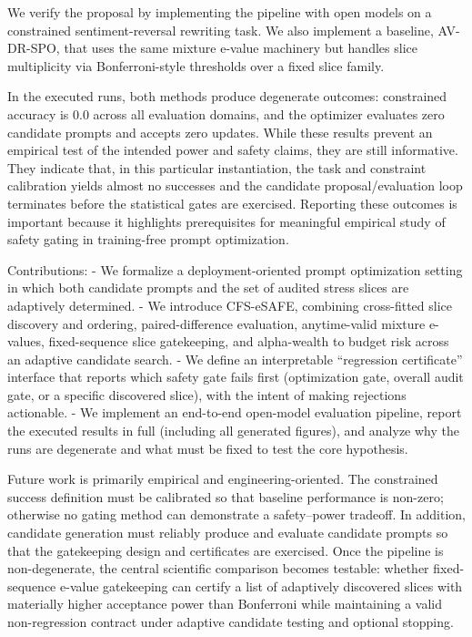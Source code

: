 \documentclass{article} %
\begin{document}
We verify the proposal by implementing the pipeline with open models on a constrained sentiment-reversal rewriting task. We also implement a baseline, AV-DR-SPO, that uses the same mixture e-value machinery but handles slice multiplicity via Bonferroni-style thresholds over a fixed slice family.

In the executed runs, both methods produce degenerate outcomes: constrained accuracy is 0.0 across all evaluation domains, and the optimizer evaluates zero candidate prompts and accepts zero updates. While these results prevent an empirical test of the intended power and safety claims, they are still informative. They indicate that, in this particular instantiation, the task and constraint calibration yields almost no successes and the candidate proposal/evaluation loop terminates before the statistical gates are exercised. Reporting these outcomes is important because it highlights prerequisites for meaningful empirical study of safety gating in training-free prompt optimization.

Contributions:
- We formalize a deployment-oriented prompt optimization setting in which both candidate prompts and the set of audited stress slices are adaptively determined.
- We introduce CFS-eSAFE, combining cross-fitted slice discovery and ordering, paired-difference evaluation, anytime-valid mixture e-values, fixed-sequence slice gatekeeping, and alpha-wealth to budget risk across an adaptive candidate search.
- We define an interpretable “regression certificate” interface that reports which safety gate fails first (optimization gate, overall audit gate, or a specific discovered slice), with the intent of making rejections actionable.
- We implement an end-to-end open-model evaluation pipeline, report the executed results in full (including all generated figures), and analyze why the runs are degenerate and what must be fixed to test the core hypothesis.

Future work is primarily empirical and engineering-oriented. The constrained success definition must be calibrated so that baseline performance is non-zero; otherwise no gating method can demonstrate a safety–power tradeoff. In addition, candidate generation must reliably produce and evaluate candidate prompts so that the gatekeeping design and certificates are exercised. Once the pipeline is non-degenerate, the central scientific comparison becomes testable: whether fixed-sequence e-value gatekeeping can certify a list of adaptively discovered slices with materially higher acceptance power than Bonferroni while maintaining a valid non-regression contract under adaptive candidate testing and optional stopping.
\end{document}
